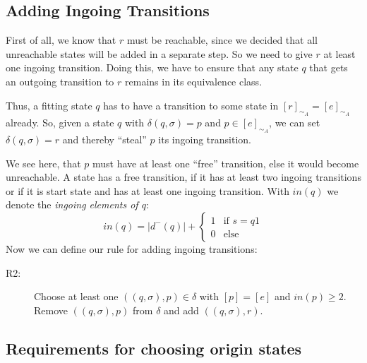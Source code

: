 \subsection{Adding Ingoing Transitions}

First of all, we know that $r$ must be reachable, since we decided that all unreachable states will be added in a separate step. So we need to give $r$ at least one ingoing transition. Doing this, we have to ensure that any state $q$ that gets an outgoing transition to $r$ remains in its equivalence class.

Thus, a fitting state $q$ has to have a transition to some state in $[r]_{\sim_A} = [e]_{\sim_A}$ already. So, given a state $q$ with $\delta(q, \sigma) = p$ and $p \in [e]_{\sim_A}$, we can set $\delta(q, \sigma) = r$ and thereby ``steal'' $p$ its ingoing transition.

We see here, that $p$ must have at least one ``free'' transition, else it would become unreachable. A state has a free transition, if it has at least two ingoing transitions or if it is start state and has at least one ingoing transition. With $in(q)$ we denote the \emph{ingoing elements of $q$}:
\[
	in(q) = |d^-(q)| + \begin{cases}
							1 & \text{if } s = q1\\
							0 & \text{else}
						 \end{cases}
\]
Now we can define our rule for adding ingoing transitions:
\begin{description}
	\item[R2:] Choose at least one $((q, \sigma), p) \in \delta$ with $[p] = [e]$ and $in(p) \ge 2$. Remove $((q, \sigma), p)$ from $\delta$ and add $((q, \sigma), r)$.
\end{description}

\subsection{Requirements for choosing origin states}

